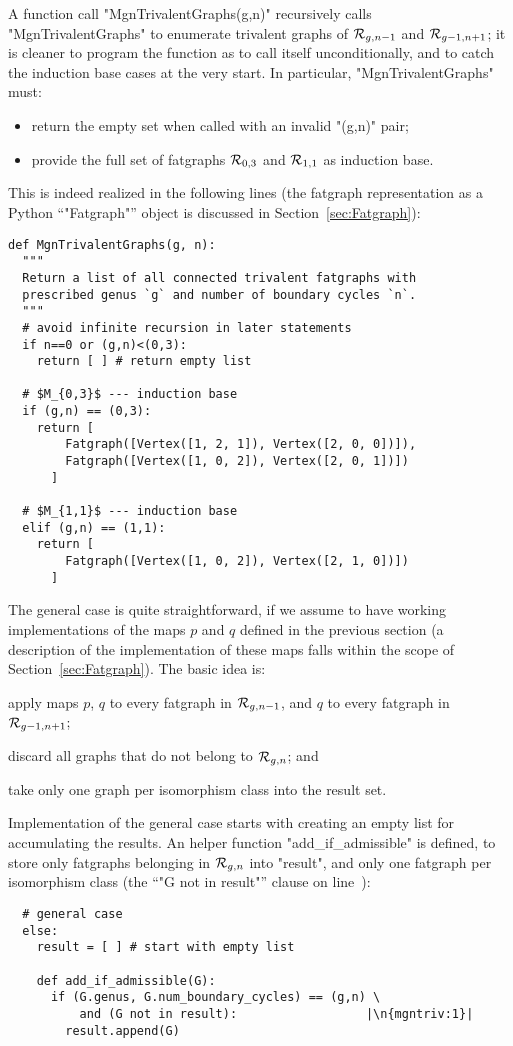 A function call "MgnTrivalentGraphs(g,n)" recursively calls
"MgnTrivalentGraphs" to enumerate trivalent graphs of $\mathcal{R}_{g,n-1}$
and $\mathcal{R}_{g-1,n+1}$; it is cleaner to program the function as to call itself
unconditionally, and to catch the induction base cases at the very
start.  In particular, "MgnTrivalentGraphs" must:
\begin{itemize}
\item return the empty set when called with an invalid "(g,n)" pair;
\item provide the full set of fatgraphs $\mathcal{R}_{0,3}$ and $\mathcal{R}_{1,1}$ as
  induction base.
\end{itemize}
This is indeed realized in the following lines (the fatgraph
representation as a Python ``"Fatgraph"'' object is discussed in
Section~\ref{sec:Fatgraph}):
\begin{lstlisting}
def MgnTrivalentGraphs(g, n):
  """
  Return a list of all connected trivalent fatgraphs with
  prescribed genus `g` and number of boundary cycles `n`.
  """
  # avoid infinite recursion in later statements
  if n==0 or (g,n)<(0,3):
    return [ ] # return empty list

  # $M_{0,3}$ --- induction base
  if (g,n) == (0,3):
    return [ 
        Fatgraph([Vertex([1, 2, 1]), Vertex([2, 0, 0])]),
        Fatgraph([Vertex([1, 0, 2]), Vertex([2, 0, 1])]) 
      ]

  # $M_{1,1}$ --- induction base
  elif (g,n) == (1,1):
    return [ 
        Fatgraph([Vertex([1, 0, 2]), Vertex([2, 1, 0])]) 
      ]
\end{lstlisting}

The general case is quite straightforward, if we assume to have
working implementations of the maps $p$ and $q$ defined in the
previous section (a description of the implementation of these maps
falls within the scope of Section~\ref{sec:Fatgraph}).  The basic
idea is:
\begin{inparaenum}
\item apply maps $p$, $q$ to every fatgraph in $\mathcal{R}_{g,n-1}$, and $q$
  to every fatgraph in $\mathcal{R}_{g-1,n+1}$;
\item discard all graphs that do not belong to $\mathcal{R}_{g,n}$; and
\item take only one graph per isomorphism class into the result
  set.
\end{inparaenum}

Implementation of the general case starts with creating an empty list
for accumulating the results.  An helper function
"add_if_admissible" is defined, to store only fatgraphs belonging in
$\mathcal{R}_{g,n}$ into "result", and only one fatgraph per isomorphism
class (the ``"G not in result"'' clause on line~):
\begin{lstlisting}
  # general case
  else:
    result = [ ] # start with empty list

    def add_if_admissible(G):
      if (G.genus, G.num_boundary_cycles) == (g,n) \
          and (G not in result):                  |\n{mgntriv:1}|
        result.append(G)
      
\end{lstlisting}

